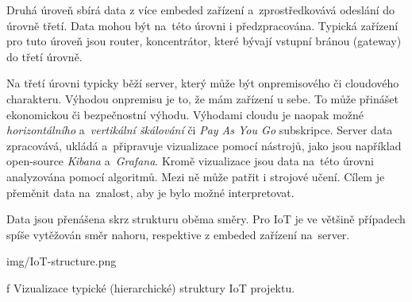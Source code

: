 {\sbf Druhá úroveň} sbírá data z více embeded zařízení a~zprostředkovává odeslání do úrovně třetí. Data mohou být na~této úrovni i předzpracována. Typická zařízení pro tuto úroveň jsou router, koncentrátor, které bývají vstupní bránou (gateway) do třetí úrovně.

Na {\sbf třetí úrovni} typicky běží server, který může být onpremisového či cloudového charakteru. Výhodou onpremisu je to, že mám zařízení u sebe. To může přinášet ekonomickou či bezpečnostní výhodu. Výhodami cloudu je naopak možné {\em horizontálního} a~{\em vertikální škálování} či {\em Pay As You Go} subskripce. Server data zpracovává, ukládá a~připravuje vizualizace pomocí nástrojů, jako jsou například open-source {\em Kibana} a~{\em Grafana}. Kromě vizualizace jsou data na~této úrovni analyzována pomocí algoritmů. Mezi ně může patřit i strojové učení. Cílem je přeměnit data na~znalost, aby je bylo možné interpretovat.

Data jsou přenášena skrz strukturu oběma směry. Pro IoT je ve většině případech spíše vytěžován směr nahoru, respektive z embeded zařízení na~server.


\medskip
{}
\picw=15cm \cinspic img/IoT-structure.png
\caption/f Vizualizace typické (hierarchické) struktury IoT projektu.
\medskip
